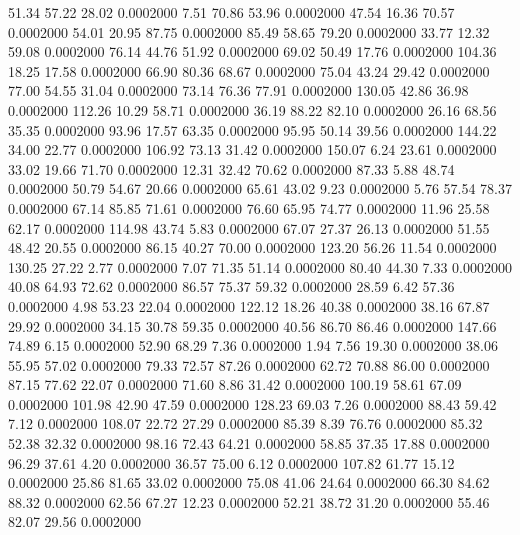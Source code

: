   51.34   57.22   28.02   0.0002000
   7.51   70.86   53.96   0.0002000
  47.54   16.36   70.57   0.0002000
  54.01   20.95   87.75   0.0002000
  85.49   58.65   79.20   0.0002000
  33.77   12.32   59.08   0.0002000
  76.14   44.76   51.92   0.0002000
  69.02   50.49   17.76   0.0002000
 104.36   18.25   17.58   0.0002000
  66.90   80.36   68.67   0.0002000
  75.04   43.24   29.42   0.0002000
  77.00   54.55   31.04   0.0002000
  73.14   76.36   77.91   0.0002000
 130.05   42.86   36.98   0.0002000
 112.26   10.29   58.71   0.0002000
  36.19   88.22   82.10   0.0002000
  26.16   68.56   35.35   0.0002000
  93.96   17.57   63.35   0.0002000
  95.95   50.14   39.56   0.0002000
 144.22   34.00   22.77   0.0002000
 106.92   73.13   31.42   0.0002000
 150.07    6.24   23.61   0.0002000
  33.02   19.66   71.70   0.0002000
  12.31   32.42   70.62   0.0002000
  87.33    5.88   48.74   0.0002000
  50.79   54.67   20.66   0.0002000
  65.61   43.02    9.23   0.0002000
   5.76   57.54   78.37   0.0002000
  67.14   85.85   71.61   0.0002000
  76.60   65.95   74.77   0.0002000
  11.96   25.58   62.17   0.0002000
 114.98   43.74    5.83   0.0002000
  67.07   27.37   26.13   0.0002000
  51.55   48.42   20.55   0.0002000
  86.15   40.27   70.00   0.0002000
 123.20   56.26   11.54   0.0002000
 130.25   27.22    2.77   0.0002000
   7.07   71.35   51.14   0.0002000
  80.40   44.30    7.33   0.0002000
  40.08   64.93   72.62   0.0002000
  86.57   75.37   59.32   0.0002000
  28.59    6.42   57.36   0.0002000
   4.98   53.23   22.04   0.0002000
 122.12   18.26   40.38   0.0002000
  38.16   67.87   29.92   0.0002000
  34.15   30.78   59.35   0.0002000
  40.56   86.70   86.46   0.0002000
 147.66   74.89    6.15   0.0002000
  52.90   68.29    7.36   0.0002000
   1.94    7.56   19.30   0.0002000
  38.06   55.95   57.02   0.0002000
  79.33   72.57   87.26   0.0002000
  62.72   70.88   86.00   0.0002000
  87.15   77.62   22.07   0.0002000
  71.60    8.86   31.42   0.0002000
 100.19   58.61   67.09   0.0002000
 101.98   42.90   47.59   0.0002000
 128.23   69.03    7.26   0.0002000
  88.43   59.42    7.12   0.0002000
 108.07   22.72   27.29   0.0002000
  85.39    8.39   76.76   0.0002000
  85.32   52.38   32.32   0.0002000
  98.16   72.43   64.21   0.0002000
  58.85   37.35   17.88   0.0002000
  96.29   37.61    4.20   0.0002000
  36.57   75.00    6.12   0.0002000
 107.82   61.77   15.12   0.0002000
  25.86   81.65   33.02   0.0002000
  75.08   41.06   24.64   0.0002000
  66.30   84.62   88.32   0.0002000
  62.56   67.27   12.23   0.0002000
  52.21   38.72   31.20   0.0002000
  55.46   82.07   29.56   0.0002000
